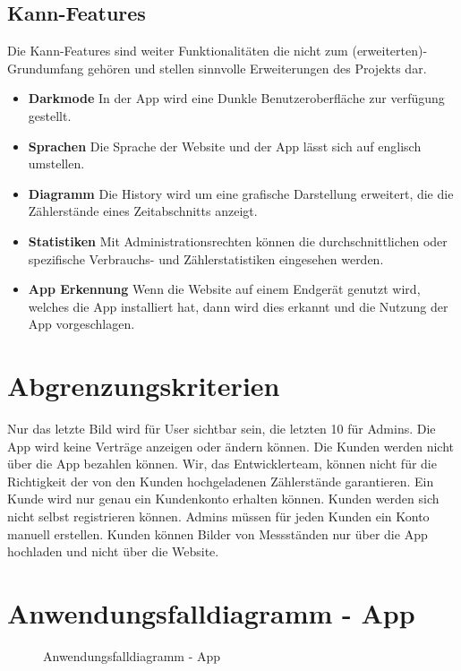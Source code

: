 \subsection{Kann-Features}
Die Kann-Features sind weiter Funktionalitäten die nicht zum (erweiterten)-Grundumfang gehören und stellen sinnvolle Erweiterungen des Projekts dar.
\begin{itemize}
\item  \textbf{Darkmode}
	In der App wird eine Dunkle Benutzeroberfläche zur verfügung gestellt.
\item \textbf{Sprachen}
	Die Sprache der Website und der App lässt sich auf englisch umstellen.
\item \textbf{Diagramm}
	Die History wird um eine grafische Darstellung erweitert, die die Zählerstände eines Zeitabschnitts anzeigt.
\item \textbf{Statistiken}
	Mit Administrationsrechten können die durchschnittlichen oder spezifische Verbrauchs- und Zählerstatistiken eingesehen werden.
\item \textbf{App Erkennung}
	Wenn die Website auf einem Endgerät genutzt wird, welches die App installiert hat, dann wird dies erkannt und
	die Nutzung der App vorgeschlagen.
\end{itemize}

\section{Abgrenzungskriterien}

Nur das letzte Bild wird für User sichtbar sein, die letzten 10 für Admins.
Die App wird keine Verträge anzeigen oder ändern können.
Die Kunden werden nicht über die App bezahlen können.
Wir, das Entwicklerteam, können nicht für die Richtigkeit der von den Kunden hochgeladenen Zählerstände garantieren.
Ein Kunde wird nur genau ein Kundenkonto erhalten können.
Kunden werden sich nicht selbst registrieren können. Admins müssen für jeden Kunden ein Konto manuell erstellen.
Kunden können Bilder von Messständen nur über die App hochladen und nicht über die Website.



\section{Anwendungsfalldiagramm - App}

\begin{figure}[h]
	\centering
	\caption{Anwendungsfalldiagramm - App}
	\label{fig:anwendungsfalldiagramm-app}
\end{figure}


